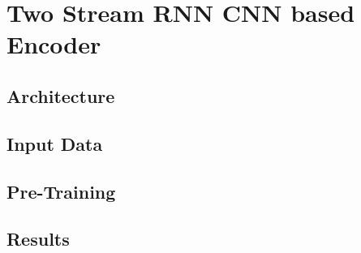\chapter{Two Stream RNN CNN based Encoder}

\section{Architecture}

\section{Input Data}

\section{Pre-Training}

\section{Results}
